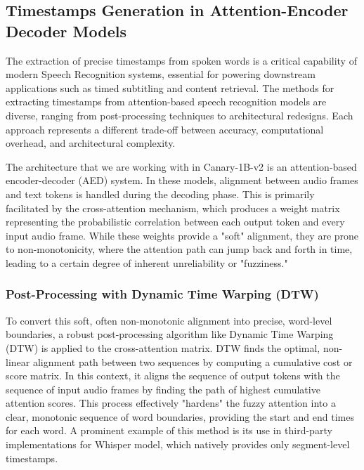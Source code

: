 \label{sec:timestamps}

\subsection{Timestamps Generation in Attention-Encoder Decoder Models}

The extraction of precise timestamps from spoken words is a critical capability of modern Speech Recognition systems, essential for powering downstream applications such as timed subtitling and content retrieval. The methods for extracting timestamps from attention-based speech recognition models are diverse, ranging from post-processing techniques to architectural redesigns. Each approach represents a different trade-off between accuracy, computational overhead, and architectural complexity.

The architecture that we are working with in Canary-1B-v2 is an attention-based encoder-decoder (AED) system. In these models, alignment between audio frames and text tokens is handled during the decoding phase. This is primarily facilitated by the cross-attention mechanism, which produces a weight matrix representing the probabilistic correlation between each output token and every input audio frame. While these weights provide a "soft" alignment, they are prone to non-monotonicity, where the attention path can jump back and forth in time, leading to a certain degree of inherent unreliability or "fuzziness."

\subsubsection{Post-Processing with Dynamic Time Warping (DTW)}
To convert this soft, often non-monotonic alignment into precise, word-level boundaries, a robust post-processing algorithm like Dynamic Time Warping (DTW)\cite{DTWAlignment} is applied to the cross-attention matrix. DTW finds the optimal, non-linear alignment path between two sequences by computing a cumulative cost or score matrix. In this context, it aligns the sequence of output tokens with the sequence of input audio frames by finding the path of highest cumulative attention scores. This process effectively "hardens" the fuzzy attention into a clear, monotonic sequence of word boundaries, providing the start and end times for each word. A prominent example of this method is its use in third-party implementations\cite{lintoai2023whispertimestamped} for Whisper\cite{radford2023whisper} model, which natively provides only segment-level timestamps.

